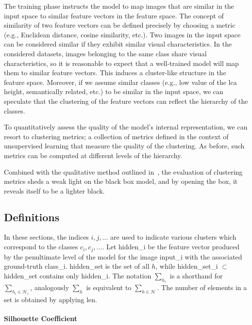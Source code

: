 The training phase instructs the model to map images that are similar in the input space to similar feature vectors in the feature space. The concept of similarity of two feature vectors can be defined precisely by choosing a metric (e.g., Euclidean distance, cosine similarity, etc.). Two images in the input space can be considered similar if they exhibit similar visual characteristics. In the considered datasets, images belonging to the same class share visual characteristics, so it is reasonable to expect that a well-trained model will map them to similar feature vectors. This induces a cluster-like structure in the feature space. Moreover, if we assume similar classes (e.g., low value of the \acrshort{lca} height, semantically related, etc.) to be similar in the input space, we can speculate that the clustering of the feature vectors can reflect the hierarchy of the classes.

To quantitatively assess the quality of the model's internal representation, we can resort to clustering metrics; a collection of metrics defined in the context of unsupervised learning that measure the quality of the clustering. As before, such metrics can be computed at different levels of the hierarchy.

Combined with the qualitative method outlined in~, the evaluation of clustering metrics sheds a weak light on the black box model, and by opening the box, it reveals itself to be a lighter black.


\subsection{Definitions}
\label{subsec:features-metrics-definitions}

In these sections, the indices $i, j, \dots$ are used to indicate various clusters which correspond to the classes $c_i, c_j, \dots$. Let \gls{hidden_i} be the feature vector produced by the penultimate level of the model for the image \gls{input_i} with the associated ground-truth \gls{class_i}. \gls{hidden_set} is the set of all $h$, while \gls{hidden_set_i} $\subset$ \gls{hidden_set} contains only \gls{hidden_i}. The notation $\sum_{h_i}$ is a shorthand for $\sum_{h_i \in \mathcal{H}_i}$, analogously $\sum_{h}$ is equivalent to $\sum_{h \in \mathcal{H}}$. The number of elements in a set is obtained by applying \gls{len}.

\paragraph{Silhouette Coefficient}
\label{par:silhouette-coefficient}

